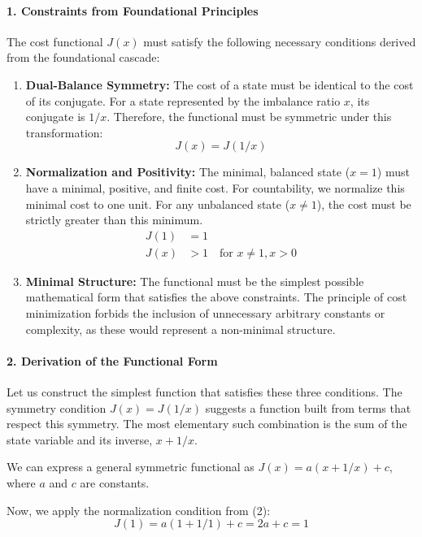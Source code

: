 \documentclass[11pt,a4paper]{article}
\begin{document}
\paragraph{1. Constraints from Foundational Principles}
The cost functional \(J(x)\) must satisfy the following necessary conditions derived from the foundational cascade:
\begin{enumerate}
    \item \textbf{Dual-Balance Symmetry:} The cost of a state must be identical to the cost of its conjugate. For a state represented by the imbalance ratio \(x\), its conjugate is \(1/x\). Therefore, the functional must be symmetric under this transformation:
    \begin{equation}
    J(x) = J(1/x)
    \end{equation}

    \item \textbf{Normalization and Positivity:} The minimal, balanced state (\(x=1\)) must have a minimal, positive, and finite cost. For countability, we normalize this minimal cost to one unit. For any unbalanced state (\(x \neq 1\)), the cost must be strictly greater than this minimum.
    \begin{align}
    J(1) &= 1 \\
    J(x) &> 1 \quad \text{for } x \neq 1, x > 0
    \end{align}

    \item \textbf{Minimal Structure:} The functional must be the simplest possible mathematical form that satisfies the above constraints. The principle of cost minimization forbids the inclusion of unnecessary arbitrary constants or complexity, as these would represent a non-minimal structure.
\end{enumerate}

\paragraph{2. Derivation of the Functional Form}
Let us construct the simplest function that satisfies these three conditions. The symmetry condition \(J(x) = J(1/x)\) suggests a function built from terms that respect this symmetry. The most elementary such combination is the sum of the state variable and its inverse, \(x + 1/x\).

We can express a general symmetric functional as \(J(x) = a(x + 1/x) + c\), where \(a\) and \(c\) are constants.

Now, we apply the normalization condition from (2):
\begin{equation}
J(1) = a(1 + 1/1) + c = 2a + c = 1
\end{equation}
\end{document}
